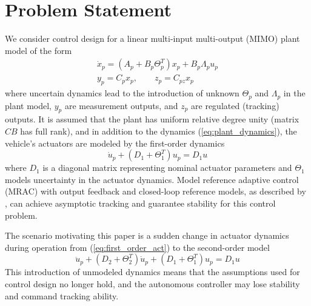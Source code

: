 \documentclass[english]{ifacconf}
\begin{document}
\section{Problem Statement}\label{sec:problem}
We consider control design for a linear multi-input multi-output (MIMO) plant model of the form
\begin{equation}
\begin{gathered}
\dot x_p = (A_p + B_p \Theta_p^T) x_p + B_p \Lambda_p u_p \\
y_p = C_p x_p, \qquad z_p = C_{pz} x_p \label{eq:plant_dynamics}
\end{gathered}
\end{equation}
where uncertain dynamics lead to the introduction of unknown $\Theta_p$ and $\Lambda_p$ in the plant model, $y_p$ are measurement outputs, and $z_p$ are regulated (tracking) outputs. It is assumed that the plant has uniform relative degree unity (matrix $CB$ has full rank), and in addition to the dynamics (\ref{eq:plant_dynamics}), the vehicle's actuators are modeled by the first-order dynamics
\begin{equation}
	\dot{u}_p + (D_1 + \Theta_1^T) u_p = D_1 u \label{eq:first_order_act}
\end{equation}
where $D_1$ is a diagonal matrix representing nominal actuator parameters and $\Theta_1$ models uncertainty in the actuator dynamics. Model reference adaptive control (MRAC) with output feedback and closed-loop reference models, as described by \cite{qu2016adaptive}, can achieve asymptotic tracking and guarantee stability for this control problem. 

The scenario motivating this paper is a sudden change in actuator dynamics during operation from (\ref{eq:first_order_act}) to the second-order model
\begin{equation}
	\ddot{u}_p + (D_2 + \Theta_2^T) \dot{u}_p + (D_1 + \Theta_1^T) u_p = D_1 u \label{eq:second_order_act}
\end{equation}
This introduction of unmodeled dynamics means that the assumptions used for control design no longer hold, and the autonomous controller may lose stability and command tracking ability. 
\end{document}
